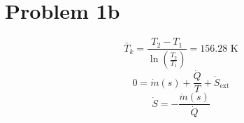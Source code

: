 \section*{Problem 1b}
\[
\bar{T}_k = \frac{T_2 - T_1}{\ln \left( \frac{T_2}{T_1} \right)} = \boxed{156.28 \text{ K}}
\]
\[
0 = \dot{m}(s) + \frac{\dot{Q}}{T} + \dot{S}_{\text{ext}}
\]
\[
\dot{S} = -\frac{\dot{m}(s)}{\dot{Q}}
\]